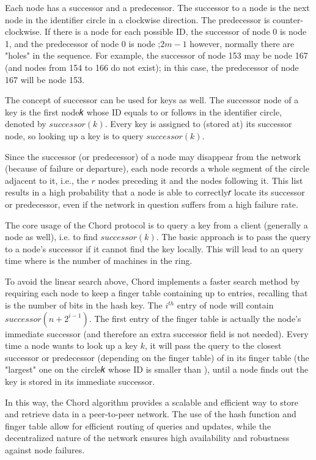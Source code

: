 \documentclass[twocolumn]{article}
\begin{document}
Each node has a successor and a predecessor. The successor to a node is the next node in the identifier
circle in a clockwise direction. The predecessor is counter-clockwise. If there is a node for each
possible ID, the successor of node 0 is node 1, and the predecessor of node 0 is node ;$2m − 1$
however, normally there are "holes" in the sequence. For example, the successor of node 153 may be
node 167 (and nodes from 154 to 166 do not exist); in this case, the predecessor of node 167 will be
node 153.

The concept of successor can be used for keys as well. The successor node of a key is the first node𝑘
whose ID equals to or follows in the identifier circle, denoted by $successor(k)$. Every key is assigned to (stored at) its successor node, so looking up a key is to query $successor(k)$.

Since the successor (or predecessor) of a node may disappear from the network (because of failure or
departure), each node records a whole segment of the circle adjacent to it, i.e., the $r$ nodes preceding it
and the nodes following it. This list results in a high probability that a node is able to correctly𝑟
locate its successor or predecessor, even if the network in question suffers from a high failure rate.

The core usage of the Chord protocol is to query a key from a client (generally a node as well), i.e. to
find $successor(k)$. The basic approach is to pass the query to a node's successor if it cannot find the
key locally. This will lead to an query time where is the number of machines in the ring.

To avoid the linear search above, Chord implements a faster search method by requiring each node to
keep a finger table containing up to entries, recalling that is the number of bits in the hash key.
The $i^{th}$ entry of node will contain $successor(n+2^{i-1})$. The first entry of the finger table
is actually the node's immediate successor (and therefore an extra successor field is not needed).
Every time a node wants to look up a key $k$, it will pass the query to the closest successor or
predecessor (depending on the finger table) of in its finger table (the "largest" one on the circle𝑘
whose ID is smaller than ), until a node finds out the key is stored in its immediate successor.

In this way, the Chord algorithm provides a scalable and efficient way to store and retrieve data in a peer-to-peer network. The use of the hash function and finger table allow for efficient routing of queries and updates, while the decentralized nature of the network ensures high availability and robustness against node failures.
\end{document}
